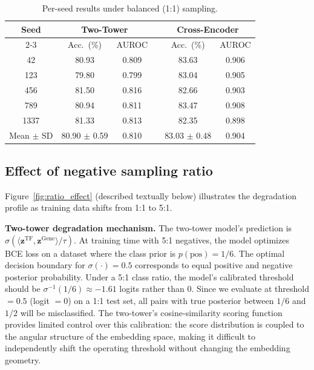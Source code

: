 \documentclass[10pt,twocolumn]{article}
\begin{document}
\begin{table}[!htbp]
\centering
\caption{Per-seed results under balanced (1:1) sampling.}
\label{tab:per_seed}
\small
\begin{tabular}{@{}cccccc@{}}
\toprule
\multirow{2}{*}{\textbf{Seed}} & \multicolumn{2}{c}{\textbf{Two-Tower}} & & \multicolumn{2}{c}{\textbf{Cross-Encoder}} \\
\cmidrule{2-3} \cmidrule{5-6}
 & Acc.\ (\%) & AUROC & & Acc.\ (\%) & AUROC \\
\midrule
42   & 80.93 & 0.809 & & 83.63 & 0.906 \\
123  & 79.80 & 0.799 & & 83.04 & 0.905 \\
456  & 81.50 & 0.816 & & 82.66 & 0.903 \\
789  & 80.94 & 0.811 & & 83.47 & 0.908 \\
1337 & 81.33 & 0.813 & & 82.35 & 0.898 \\
\midrule
Mean $\pm$ SD & 80.90 $\pm$ 0.59 & 0.810 & & 83.03 $\pm$ 0.48 & 0.904 \\
\bottomrule
\end{tabular}
\end{table}

\subsection{Effect of negative sampling ratio}
\label{sec:ratio_analysis}

Figure~\ref{fig:ratio_effect} (described textually below) illustrates the
degradation profile as training data shifts from 1:1 to 5:1.

\textbf{Two-tower degradation mechanism.}
The two-tower model's prediction is $\sigma(\langle \mathbf{z}^{\text{TF}},
\mathbf{z}^{\text{Gene}} \rangle / \tau)$.
At training time with 5:1 negatives, the model optimizes BCE loss on a dataset
where the class prior is $p(\text{pos}) = 1/6$.
The optimal decision boundary for $\sigma(\cdot) = 0.5$ corresponds to equal
positive and negative posterior probability.
Under a 5:1 class ratio, the model's calibrated threshold should be
$\sigma^{-1}(1/6) \approx -1.61$ logits rather than 0.
Since we evaluate at threshold $= 0.5$ (logit $= 0$) on a 1:1 test set,
all pairs with true posterior between $1/6$ and $1/2$ will be misclassified.
The two-tower's cosine-similarity scoring function provides limited control
over this calibration: the score distribution is coupled to the angular
structure of the embedding space, making it difficult to independently shift
the operating threshold without changing the embedding geometry.
\end{document}
